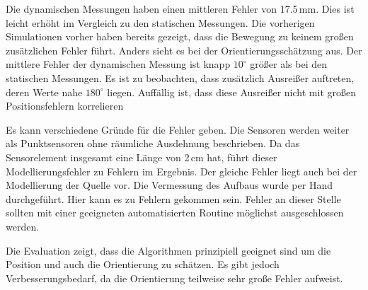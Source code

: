 Die dynamischen Messungen haben einen mittleren Fehler von 17.5\,mm. Dies ist leicht erhöht im Vergleich zu den statischen Messungen. Die vorherigen Simulationen vorher haben bereits gezeigt, dass die Bewegung zu keinem großen zusätzlichen Fehler führt. Anders sieht es bei der Orientierungsschätzung aus. Der mittlere Fehler der dynamischen Messung ist knapp $10^\circ$ größer als bei den statischen Messungen. Es ist zu beobachten, dass zusätzlich Ausreißer auftreten, deren Werte nahe $180^\circ$ liegen. Auffällig ist, dass diese Ausreißer nicht mit großen Positionsfehlern korrelieren

Es kann verschiedene Gründe für die Fehler geben. Die Sensoren werden weiter als Punktsensoren ohne räumliche Ausdehnung beschrieben. Da das Sensorelement insgesamt eine Länge von 2\,cm hat, führt dieser Modellierungsfehler zu Fehlern im Ergebnis. Der gleiche Fehler liegt auch bei der Modellierung der Quelle vor. Die Vermessung des Aufbaus wurde per Hand durchgeführt. Hier kann es zu Fehlern gekommen sein. Fehler an dieser Stelle sollten mit einer geeigneten automatisierten Routine möglichst ausgeschlossen werden. 

Die Evaluation zeigt, dass die Algorithmen prinzipiell geeignet sind um die Position und auch die Orientierung zu schätzen. Es gibt jedoch Verbesserungsbedarf, da die Orientierung teilweise sehr große Fehler aufweist.